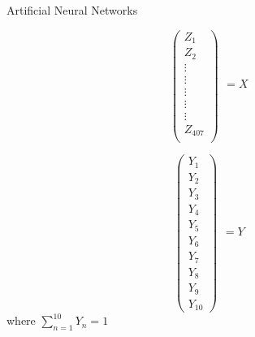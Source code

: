 \documentclass{beamer}
\begin{document}
\begin{frame}{Artificial Neural Networks}
\begin{minipage}[t]{0.5\textwidth}
$$
\begin{pmatrix}
Z_1\\ 
Z_2\\ 
\vdots \\ 
\vdots\\ 
\vdots\\ 
\vdots\\ 
\vdots\\ 
Z_{407}\\ 
\end{pmatrix}
\begin{matrix}
\\ 
\\ 
\\ 
\\ 
=X\\ 
\\ 
\\ 
\\ 
\\
\end{matrix}
$$
\end{minipage}\hfill
\begin{minipage}[t]{0.5\textwidth}
$$
\begin{pmatrix}
Y_1\\ 
Y_2\\ 
Y_3\\ 
Y_4\\ 
Y_5\\ 
Y_6\\ 
Y_7\\ 
Y_8\\ 
Y_{9}\\ 
Y_{10}
\end{pmatrix}
\begin{matrix}
\\ 
\\ 
\\ 
\\ 
\\ 
=Y\\ 
\\ 
\\ 
\\ 
\\ 
\\ 
\end{matrix}
$$
where $\sum_{n=1}^{10}Y_n=1$
\end{minipage}
\end{frame}
\end{document}
